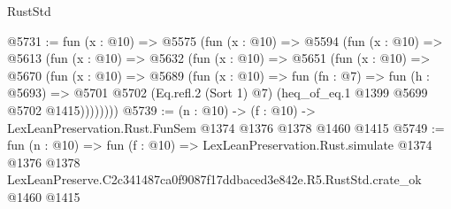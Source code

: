 \begin{lexlean}{RustStd}
\begin{coremodule}
@5731 := fun (x : @10) =>
  @5575
    (fun (x : @10) =>
    @5594
      (fun (x : @10) =>
      @5613
        (fun (x : @10) =>
        @5632
          (fun (x : @10) =>
          @5651
            (fun (x : @10) =>
            @5670
              (fun (x : @10) =>
              @5689
                (fun (x : @10) =>
                fun (fn : @7) =>
                fun (h : @5693) =>
                @5701 @5702 (Eq.refl.{2} (Sort 1) @7) (heq_of_eq.{1} @1399 @5699 @5702 @1415))))))))
@5739 := (n : @10) -> (f : @10) -> LexLeanPreservation.Rust.FunSem @1374 @1376 @1378 @1460 @1415
@5749 := fun (n : @10) =>
  fun (f : @10) =>
  LexLeanPreservation.Rust.simulate
    @1374
    @1376
    @1378
    LexLeanPreserve.C2c341487ca0f9087f17ddbaced3e842e.R5.RustStd.crate_ok
    @1460
    @1415
\end{coremodule}
\end{lexlean}
